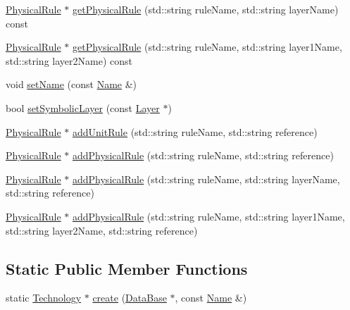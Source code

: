 \begin{DoxyCompactItemize}
\item 
\mbox{\hyperlink{classHurricane_1_1PhysicalRule}{Physical\+Rule}} $\ast$ \mbox{\hyperlink{classHurricane_1_1Technology_a21ef6f7507785a587e56aecc52a0c0ee}{get\+Physical\+Rule}} (std\+::string rule\+Name, std\+::string layer\+Name) const
\item 
\mbox{\hyperlink{classHurricane_1_1PhysicalRule}{Physical\+Rule}} $\ast$ \mbox{\hyperlink{classHurricane_1_1Technology_aec2ce8a8195e90537e6d35cb3ba8b58f}{get\+Physical\+Rule}} (std\+::string rule\+Name, std\+::string layer1\+Name, std\+::string layer2\+Name) const
\item 
void \mbox{\hyperlink{classHurricane_1_1Technology_a247b75d5cbb85198cea9e5e609304cd0}{set\+Name}} (const \mbox{\hyperlink{classHurricane_1_1Name}{Name}} \&)
\item 
bool \mbox{\hyperlink{classHurricane_1_1Technology_a26c12c5828acaeb33068a2899df1134b}{set\+Symbolic\+Layer}} (const \mbox{\hyperlink{classHurricane_1_1Layer}{Layer}} $\ast$)
\item 
\mbox{\hyperlink{classHurricane_1_1PhysicalRule}{Physical\+Rule}} $\ast$ \mbox{\hyperlink{classHurricane_1_1Technology_a96d62a8b3eb12560a9cb778328f8a301}{add\+Unit\+Rule}} (std\+::string rule\+Name, std\+::string reference)
\item 
\mbox{\hyperlink{classHurricane_1_1PhysicalRule}{Physical\+Rule}} $\ast$ \mbox{\hyperlink{classHurricane_1_1Technology_a267e44b205b97ff46297d16ed278a5bc}{add\+Physical\+Rule}} (std\+::string rule\+Name, std\+::string reference)
\item 
\mbox{\hyperlink{classHurricane_1_1PhysicalRule}{Physical\+Rule}} $\ast$ \mbox{\hyperlink{classHurricane_1_1Technology_a4210936e097a774035bf52bce7d962bc}{add\+Physical\+Rule}} (std\+::string rule\+Name, std\+::string layer\+Name, std\+::string reference)
\item 
\mbox{\hyperlink{classHurricane_1_1PhysicalRule}{Physical\+Rule}} $\ast$ \mbox{\hyperlink{classHurricane_1_1Technology_a3f04a0d9fe9c76fc3c0911c76c120e00}{add\+Physical\+Rule}} (std\+::string rule\+Name, std\+::string layer1\+Name, std\+::string layer2\+Name, std\+::string reference)
\end{DoxyCompactItemize}
\subsection*{Static Public Member Functions}
\begin{DoxyCompactItemize}
\item 
static \mbox{\hyperlink{classHurricane_1_1Technology}{Technology}} $\ast$ \mbox{\hyperlink{classHurricane_1_1Technology_a64670f0d48e9460342005df52f25c152}{create}} (\mbox{\hyperlink{classHurricane_1_1DataBase}{Data\+Base}} $\ast$, const \mbox{\hyperlink{classHurricane_1_1Name}{Name}} \&)
\end{DoxyCompactItemize}


